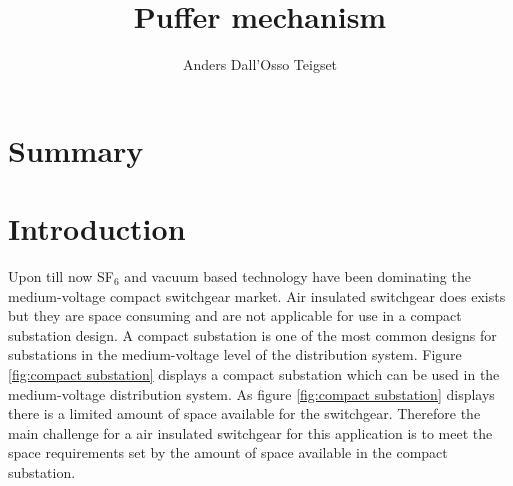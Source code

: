 \documentclass[10pt,a4paper]{article}
\author{Anders Dall'Osso Teigset}
\title{Puffer mechanism}
\begin{document}
\maketitle
\section{Summary}
\tableofcontents
\section{Introduction}
Upon till now SF$_6$ and vacuum based technology have been dominating the medium-voltage compact switchgear market. Air insulated switchgear does exists but they are space consuming and are not applicable for use in a compact substation design. A compact substation is one of the most common designs for substations in the medium-voltage level of the distribution system. Figure \ref{fig:compact substation} displays a compact substation which can be used in the medium-voltage distribution system. As figure \ref{fig:compact substation} displays there is a limited amount of space available for the switchgear. Therefore the main challenge for a air insulated switchgear for this application is to meet the space requirements set by the amount of space available in the compact substation. 
\end{document}
